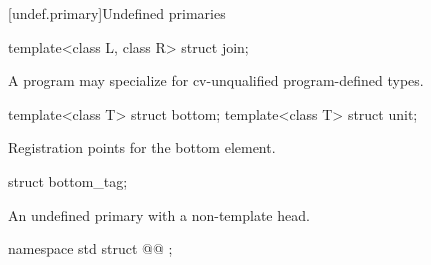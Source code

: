 [undef.primary]{Undefined primaries}

\begin{itemdecl}
template<class L, class R>
  struct join;
\end{itemdecl}

\begin{itemdescr}
\pnum
\remarks
A program may specialize  for cv-unqualified program-defined types.
\end{itemdescr}

\begin{itemdecl}
template<class T>
  struct bottom;
template<class T>
  struct unit;
\end{itemdecl}

\begin{itemdescr}
\pnum
\remarks
Registration points for the bottom element.
\end{itemdescr}

\begin{itemdecl}
struct bottom_tag;
\end{itemdecl}

\begin{itemdescr}
\pnum
\remarks
An undefined primary with a non-template head.
\end{itemdescr}

\begin{codeblock}
namespace std {
  struct @@ {};
}
\end{codeblock}

